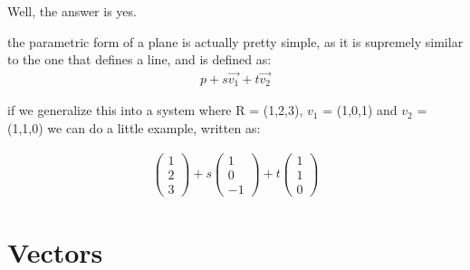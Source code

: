\documentclass[11pt,fleqn]{book} %
\begin{document}
Well, the answer is yes.

the parametric form of a plane is actually pretty simple, as it is supremely similar to 
the one that defines a line, and is defined as:
\begin{gather}
    p + s\vec{v_1} + t \vec{v_2}
\end{gather}

if we generalize this into a system where R = (1,2,3), $v_1$ = (1,0,1) and $v_2$ = (1,1,0)
we can do a little example, written as:

\begin{gather}
    \begin{pmatrix}
        1\\2\\3
    \end{pmatrix} + s \begin{pmatrix}
        1\\0\\-1
    \end{pmatrix} + t\begin{pmatrix}
        1\\1\\0
    \end{pmatrix}
\end{gather}

\section{Vectors}
\end{document}
